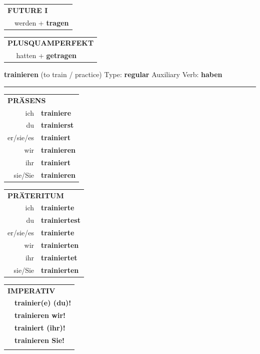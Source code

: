 \documentclass[10pt,a4paper]{revtex4-2}
\begin{document}
\begin{verbbox-acc}
\begin{tabular}{rl}
    \multicolumn{2}{l}{\textbf{FUTURE I} }\\
   & werden + \textbf{tragen}\\
 
  \end{tabular}
\hfill
   \begin{tabular}{rl}
      \multicolumn{2}{l}{\textbf{PLUSQUAMPERFEKT}}\\
   & hatten + \textbf{getragen}\\
  \end{tabular}
  
  \vspace{-5pt}


\end{verbbox-acc}


\begin{verbbox}
    {\Large \bf trainieren} (to train / practice) \hfill Type: \textbf{regular} \hfill Auxiliary Verb: \textbf{haben} 
    
     \vspace{5pt}
    \hrule
    \vspace{5pt}

  \begin{tabular}{rl}
     \multicolumn{2}{l}{\textbf{PRÄSENS} }\\
    ich & \textbf{trainiere}\\
    du & \textbf{trainierst}\\
    er/sie/es & \textbf{trainiert}\\
    wir & \textbf{trainieren}\\
    ihr & \textbf{trainiert}\\
    sie/Sie & \textbf{trainieren}\\
  \end{tabular}
  \hfill
     \begin{tabular}{rl}
    \multicolumn{2}{l}{\textbf{PRÄTERITUM} }\\
    ich & \textbf{trainierte}\\
    du & \textbf{trainiertest}\\
    er/sie/es & \textbf{trainierte}\\
    wir & \textbf{trainierten}\\
    ihr & \textbf{trainiertet}\\
    sie/Sie & \textbf{trainierten}\\
  \end{tabular}
  \hfill
  \begin{tabular}{rl}
     \multicolumn{2}{l}{\textbf{IMPERATIV} }\\
   & \textbf{trainier(e) (du)!}\\
   & \textbf{trainieren wir!}\\
   & \textbf{trainiert (ihr)!}\\
   & \textbf{trainieren Sie!}\\
   & \vspace{10pt}
  \end{tabular}


\end{verbbox}
\end{document}
